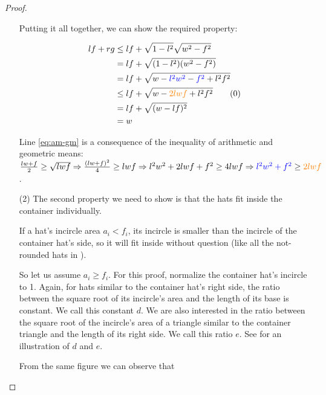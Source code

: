 \documentclass[%
    a4paper,              %
    style=screen,          %
    bibliography=totoc,   %
    nexus,                %
    lnum,                 %
    extramargin,          %
]{tubsbook}
\begin{document}
\begin{proof}
\begin{itemize}
            Putting it all together, we can show the required property:

            \begin{align*}
                lf + rg
                &\le lf + \sqrt{1-l^2} \sqrt{w^2-f^2}\\
                &= lf + \sqrt{(1-l^2)(w^2-f^2)}\\
                &= lf + \sqrt{w - \textcolor{blue}{l^2w^2} - \textcolor{blue}{f^2} + l^2f^2}\\
                &\le lf + \sqrt{w - \textcolor{orange}{2lwf} + l^2f^2}\tag{\theequation}\label{eq:am-gm}\\
                &= lf + \sqrt{(w-lf)^2}\\
                &= w
            \end{align*}

            Line \ref{eq:am-gm} is a consequence of the inequality of arithmetic and geometric means: $\frac{lw+f}{2} \ge \sqrt{lwf} \Rightarrow \frac{(lw+f)^2}{4} \ge lwf \Rightarrow l^2w^2 + 2 lwf + f^2 \ge 4 lwf \Rightarrow \textcolor{blue}{l^2w^2 + f^2} \ge \textcolor{orange}{2lwf}$.

        \item[(2)]
            The second property we need to show is that the hats fit inside the container individually.

            If a hat's incircle area $a_i < f_i$, its incircle is smaller than the incircle of the container hat's side, so it will fit inside without question (like all the not-rounded hats in ).

            So let us assume $a_i \ge f_i$. For this proof, normalize the container hat's incircle to 1. Again, for hats similar to the container hat's right side, the ratio between the square root of its incircle's area and the length of its base is constant. We call this constant $d$.
            We are also interested in the ratio between the square root of the incircle's area of a triangle similar to the container triangle and the length of its right side. We call this ratio $e$. See  for an illustration of $d$ and $e$.

            From the same figure we can observe that


\end{itemize}
\end{proof}
\end{document}
